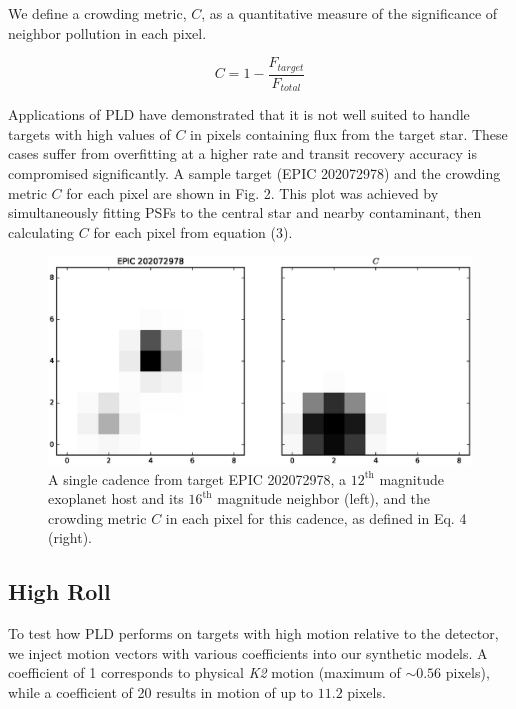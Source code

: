 \documentclass[12pt,preprint]{emulateapj}
\begin{document}
We define a crowding metric, $C$, as a quantitative measure of the significance of neighbor pollution in each pixel.

\[
\tag{4}
C = 1 - \frac{F_{target}}{F_{total}}
\]

Applications of PLD have demonstrated that it is not well suited to handle targets with high values of $C$ in pixels containing flux from the target star. These cases suffer from overfitting at a higher rate and transit recovery accuracy is compromised significantly. A sample target (EPIC 202072978) and the crowding metric $C$ for each pixel are shown in Fig. 2. This plot was achieved by simultaneously fitting PSFs to the central star and nearby contaminant, then calculating $C$ for each pixel from equation (3).

\begin{figure}[h]
	\centering
	\includegraphics[width=1.0\linewidth]{cr.eps}
	\caption{A single cadence from target EPIC 202072978, a $12^{\text{th}}$ magnitude exoplanet host and its $16^{\text{th}}$ magnitude neighbor (left), and the crowding metric $C$ in each pixel for this cadence, as defined in Eq. 4 (right).}
	\label{fig:crowding}
\end{figure}

\subsection{High Roll}

To test how PLD performs on targets with high motion relative to the detector, we inject motion vectors with various coefficients into our synthetic models. A coefficient of 1 corresponds to physical \textit{K2} motion (maximum of $\sim 0.56$ pixels), while a coefficient of 20 results in motion of up to $11.2$ pixels.
\end{document}
